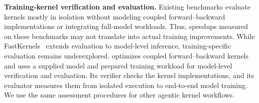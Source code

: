 \noindent\textbf{Training-kernel verification and evaluation.} Existing benchmarks evaluate kernels mostly in isolation without modeling coupled forward--backward implementations or integrating full-model workloads. Thus, speedups measured on these benchmarks may not translate into actual training improvements. While FastKernels~\cite{oliaro2026fastkernels} extends evaluation to model-level inference, training-specific evaluation remains underexplored. \method optimizes coupled forward--backward kernels and uses a supplied model and prepared training workload for model-level verification and evaluation. Its verifier checks the kernel implementations, and its evaluator measures them from isolated execution to end-to-end model training. We use the same assessment procedures for other agentic kernel workflows.

